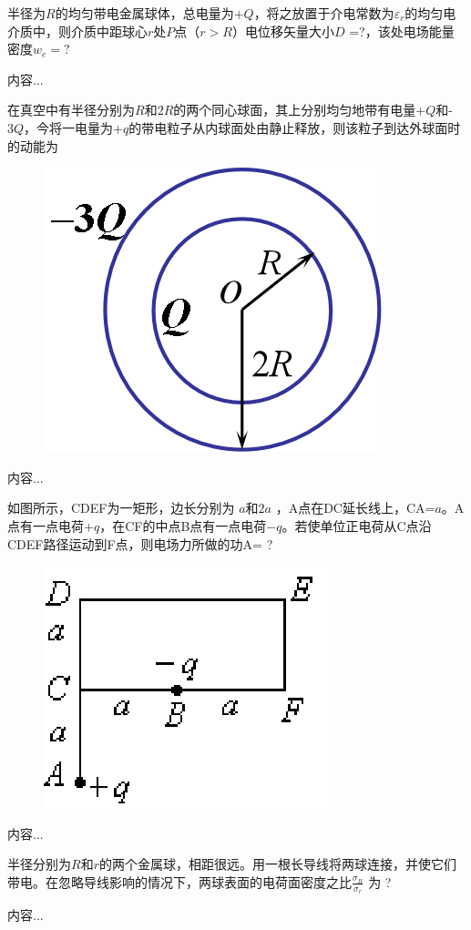 \documentclass[lang=cn,10pt]{elegantbook}
\begin{document}
		\begin{solution}
		
		\end{solution}
		\begin{exercise}
				半径为$R$的均匀带电金属球体，总电量为$+Q$，将之放置于介电常数为$\varepsilon_{r}$的均匀电介质中，则介质中距球心$r$处$P$点（$r>R$）电位移矢量大小$D$ =?，该处电场能量密度$w_{e}= ?$
		\end{exercise}
		\begin{solution}
			内容...
		\end{solution}
		\begin{exercise}
			在真空中有半径分别为$R$和$2R$的两个同心球面，其上分别均匀地带有电量$+Q$和-$3Q$，今将一电量为$+q$的带电粒子从内球面处由静止释放，则该粒子到达外球面时的动能为
\begin{figure}[H]
	\centering
	\includegraphics[width=0.1\linewidth]{image/图片7}
	\caption{}
	\label{fig:7}
\end{figure}
		\end{exercise}
		\begin{solution}
			内容...
		\end{solution}
		\begin{exercise}
			如图所示，CDEF为一矩形，边长分别为 $a$和$2a$ ，A点在DC延长线上，CA=$a$。A点有一点电荷$+q$，在CF的中点B点有一点电荷$-q$。若使单位正电荷从C点沿CDEF路径运动到F点，则电场力所做的功A= ? 
\begin{figure}[H]
	\centering
	\includegraphics[width=0.15\linewidth]{image/图片8}
	\caption{}
	\label{fig:8}
\end{figure}     
		\end{exercise}
		\begin{solution}
			内容...
		\end{solution}
		\begin{exercise}
			半径分别为$R$和$r$的两个金属球，相距很远。用一根长导线将两球连接，并使它们带电。在忽略导线影响的情况下，两球表面的电荷面密度之比$\frac{\sigma_{R}}{\sigma_{r}}$ 为 ?
		\end{exercise}
		\begin{solution}
			内容...
		\end{solution}
\end{document}
